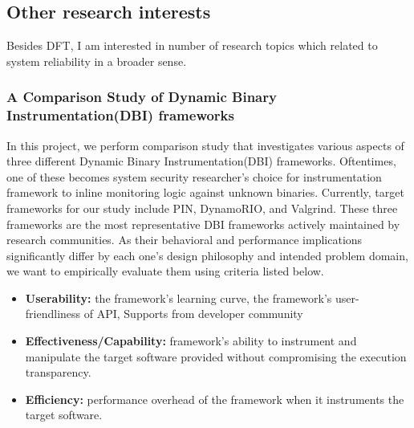 \documentclass[letterpaper, 10pt]{article}
\begin{document}
\begin{small}
\subsection*{Other research interests}
%
Besides DFT, I am interested in number of research topics which related to
system reliability in a broader sense.

\subsubsection*{A Comparison Study of Dynamic Binary Instrumentation(DBI)
frameworks}
%
In this project, we perform comparison study that investigates various aspects
of three different Dynamic Binary Instrumentation(DBI) frameworks. Oftentimes,
one of these becomes system security researcher's choice for instrumentation
framework to inline monitoring logic against unknown binaries. Currently,
target frameworks for our study include PIN, DynamoRIO, and Valgrind. These
three frameworks are the most representative DBI frameworks actively maintained
by research communities. As their behavioral and performance implications
significantly differ by each one's design philosophy and intended problem
domain, we want to empirically evaluate them using criteria listed below.

\begin{itemize}
        \item {\bf Userability:} the framework's learning curve, the framework's
           user-friendliness of API, Supports from developer community
   \item {\bf Effectiveness/Capability:} framework's ability to instrument and
            manipulate the target software provided without compromising the
            execution transparency.
    \item {\bf Efficiency:} performance overhead of the framework when it instruments
    the target software.
\end{itemize}

%


\end{small}
\end{document}
